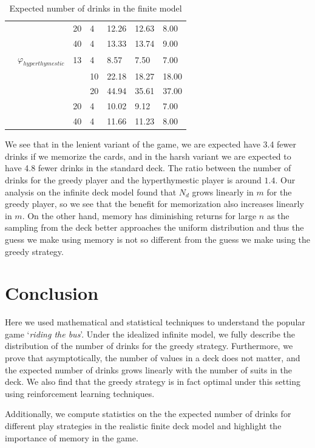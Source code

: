 \documentclass[12pt]{article}
\theoremstyle{definition}
\begin{document}
\begin{table}[]
\begin{center}
\begin{tabular}{@{}lllllll@{}}
         & & 20 & 4  & 12.26  & 12.63  & 8.00   \\
         & & 40 & 4  & 13.33  & 13.74  & 9.00   \\
         & $\varphi_{hyperthymestic}$ & 13 & 4  & 8.57   & 7.50   & 7.00   \\
         & &  & 10 & 22.18  & 18.27  & 18.00  \\
         & &  & 20 & 44.94  & 35.61  & 37.00  \\
         & & 20 & 4  & 10.02  & 9.12   & 7.00   \\
         & & 40 & 4  & 11.66  & 11.23  & 8.00   \\ \bottomrule
        \end{tabular}
        \caption{Expected number of drinks in the finite model}
        \label{fig:num_drinks_finite}

    \end{center}
\end{table}

We see that in the lenient variant of the game, we are expected have 3.4 fewer drinks if we memorize the cards, and in the harsh variant we are expected to have 4.8 fewer drinks in the standard deck. The ratio between the number of drinks for the greedy player and the hyperthymestic player is around $1.4$. Our analysis on the infinite deck model found that $N_d$ grows linearly in $m$ for the greedy player, so we see that the benefit for memorization also increases linearly in $m$. On the other hand, memory has diminishing returns for large $n$ as the sampling from the deck better approaches the uniform distribution and thus the guess we make using memory is not so different from the guess we make using the greedy strategy.

\section{Conclusion}
Here we used mathematical and statistical techniques to understand the popular game `\textit{riding the bus}'. Under the idealized infinite model, we fully describe the distribution of the number of drinks for the greedy strategy. Furthermore, we prove that asymptotically, the number of values in a deck does not matter, and the expected number of drinks grows linearly with the number of suits in the deck. We also find that the greedy strategy is in fact optimal under this setting using reinforcement learning techniques.

Additionally, we compute statistics on the the expected number of drinks for different play strategies in the realistic finite deck model and highlight the importance of memory in the game.
\end{document}
